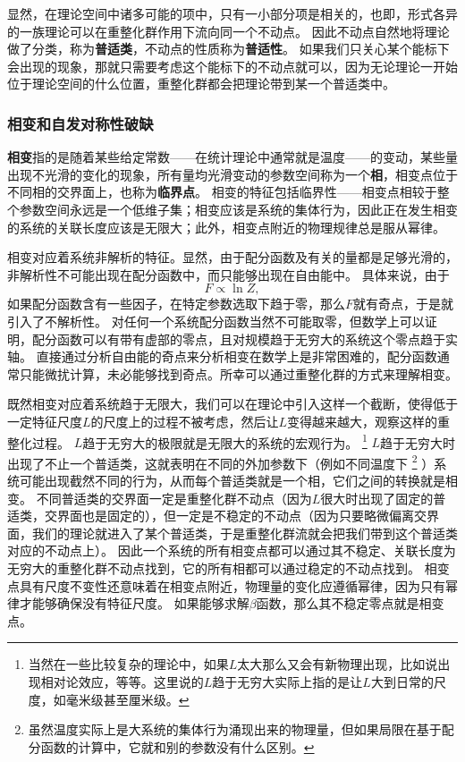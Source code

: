 \documentclass[hyperref, UTF8, a4paper]{ctexart}
\begin{document}
显然，在理论空间中诸多可能的项中，只有一小部分项是相关的，也即，形式各异的一族理论可以在重整化群作用下流向同一个不动点。
因此不动点自然地将理论做了分类，称为\textbf{普适类}，不动点的性质称为\textbf{普适性}。
如果我们只关心某个能标下会出现的现象，那就只需要考虑这个能标下的不动点就可以，因为无论理论一开始位于理论空间的什么位置，重整化群都会把理论带到某一个普适类中。

\subsubsection{相变和自发对称性破缺}

\textbf{相变}指的是随着某些给定常数——在统计理论中通常就是温度——的变动，某些量出现不光滑的变化的现象，所有量均光滑变动的参数空间称为一个\textbf{相}，相变点位于不同相的交界面上，也称为\textbf{临界点}。
相变的特征包括临界性——相变点相较于整个参数空间永远是一个低维子集；相变应该是系统的集体行为，因此正在发生相变的系统的关联长度应该是无限大；此外，相变点附近的物理规律总是服从幂律。

相变对应着系统非解析的特征。显然，由于配分函数及有关的量都是足够光滑的，非解析性不可能出现在配分函数中，而只能够出现在自由能中。
具体来说，由于
\[
    F \propto \ln Z,
\]
如果配分函数含有一些因子，在特定参数选取下趋于零，那么$F$就有奇点，于是就引入了不解析性。
对任何一个系统配分函数当然不可能取零，但数学上可以证明，配分函数可以有带有虚部的零点，且对规模趋于无穷大的系统这个零点趋于实轴。
直接通过分析自由能的奇点来分析相变在数学上是非常困难的，配分函数通常只能微扰计算，未必能够找到奇点。所幸可以通过重整化群的方式来理解相变。

既然相变对应着系统趋于无限大，我们可以在理论中引入这样一个截断，使得低于一定特征尺度$L$的尺度上的过程不被考虑，然后让$L$变得越来越大，观察这样的重整化过程。
$L$趋于无穷大的极限就是无限大的系统的宏观行为。%
\footnote{当然在一些比较复杂的理论中，如果$L$太大那么又会有新物理出现，比如说出现相对论效应，等等。这里说的$L$趋于无穷大实际上指的是让$L$大到日常的尺度，如毫米级甚至厘米级。}%
$L$趋于无穷大时出现了不止一个普适类，这就表明在不同的外加参数下（例如不同温度下%
\footnote{虽然温度实际上是大系统的集体行为涌现出来的物理量，但如果局限在基于配分函数的计算中，它就和别的参数没有什么区别。}%
）系统可能出现截然不同的行为，从而每个普适类就是一个相，它们之间的转换就是相变。
不同普适类的交界面一定是重整化群不动点（因为$L$很大时出现了固定的普适类，交界面也是固定的），但一定是不稳定的不动点（因为只要略微偏离交界面，我们的理论就进入了某个普适类，于是重整化群流就会把我们带到这个普适类对应的不动点上）。
因此一个系统的所有相变点都可以通过其不稳定、关联长度为无穷大的重整化群不动点找到，它的所有相都可以通过稳定的不动点找到。
相变点具有尺度不变性还意味着在相变点附近，物理量的变化应遵循幂律，因为只有幂律才能够确保没有特征尺度。%
如果能够求解$\beta$函数，那么其不稳定零点就是相变点。
\end{document}
